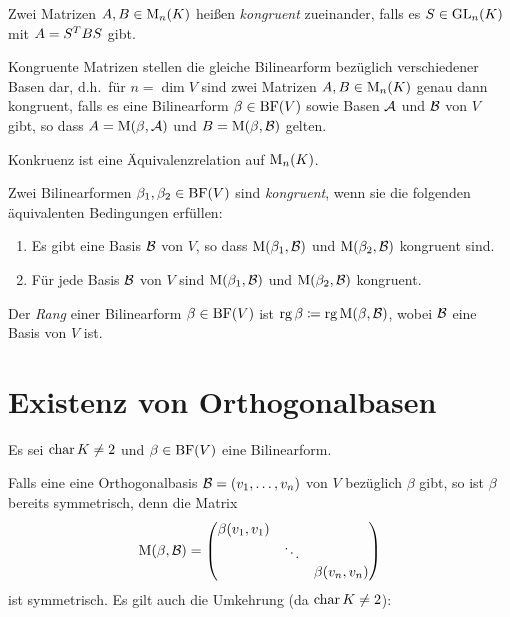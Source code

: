 \begin{definition}
  Zwei Matrizen $A, B \in \operatorname{M}_{n}(K)$ heißen \emph{kongruent} zueinander, falls es $S \in \operatorname{GL}_{n}(K)$ mit $A = S^T B S$ gibt.
\end{definition}

Kongruente Matrizen stellen die gleiche Bilinearform bezüglich verschiedener Basen dar, d.h.\ für $n = \dim V$ sind zwei Matrizen $A, B \in \operatorname{M}_{n}(K)$ genau dann kongruent, falls es eine Bilinearform $\beta \in \operatorname{BF}(V)$ sowie Basen $\mathcal{A}$ und $\mathcal{B}$ von $V$ gibt, so dass $A = \operatorname{M}(\beta, \mathcal{A})$ und $B = \operatorname{M}(\beta, \mathcal{B})$ gelten.

\begin{corollary}
  Konkruenz ist eine Äquivalenzrelation auf $\operatorname{M}_{n}(K)$.
\end{corollary}

\begin{definition}
  Zwei Bilinearformen $\beta_1, \beta_2 \in \operatorname{BF}(V)$ sind \emph{kongruent}, wenn sie die folgenden äquivalenten Bedingungen erfüllen:
  \begin{enumerate}
    \item
      Es gibt eine Basis $\mathcal{B}$ von $V$, so dass $\operatorname{M}(\beta_1, \mathcal{B})$ und $\operatorname{M}(\beta_2, \mathcal{B})$ kongruent sind.
    \item
      Für jede Basis $\mathcal{B}$ von $V$ sind $\operatorname{M}(\beta_1, \mathcal{B})$ und $\operatorname{M}(\beta_2, \mathcal{B})$ kongruent.
  \end{enumerate}
\end{definition}

\begin{definition}
  Der \emph{Rang} einer Bilinearform $\beta \in \operatorname{BF}(V)$ ist $\operatorname{rg} \beta \coloneqq \operatorname{rg} \operatorname{M}(\beta, \mathcal{B})$, wobei $\mathcal{B}$ eine Basis von $V$ ist.
\end{definition}





\section{Existenz von Orthogonalbasen}

Es sei $\operatorname{char} K \neq 2$ und $\beta \in \operatorname{BF}(V)$ eine Bilinearform.

Falls eine eine Orthogonalbasis $\mathcal{B} = (v_1, \dotsc, v_n)$ von $V$ bezüglich $\beta$ gibt, so ist $\beta$ bereits symmetrisch, denn die Matrix
\[
    \operatorname{M}(\beta, \mathcal{B})
  = \begin{pmatrix}
      \beta(v_1, v_1) &         &                 \\
                      & \ddots  &                 \\
                      &         & \beta(v_n, v_n)
    \end{pmatrix}
\]
ist symmetrisch.
Es gilt auch die Umkehrung (da $\operatorname{char} K \neq 2$):

